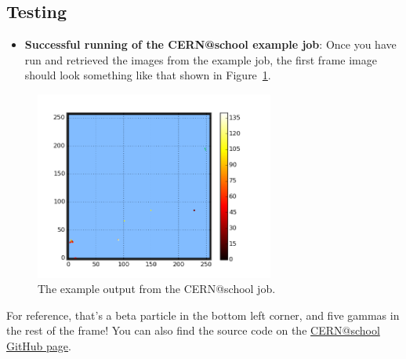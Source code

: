 \subsection{Testing}
\label{an-example-workflow-local-running---testing}

\begin{itemize}
\tightlist
\item
  \textbf{Successful running of the CERN@school example job}: Once you
  have run and retrieved the images from the example job, the first
  frame image should look something like that shown in
  Figure~\ref{fig:localrunningframe}.
\end{itemize}

%
\begin{figure}[htbp]
  \centering
  \includegraphics[width=0.7\textwidth]{assets/images/frame.png}
  \caption[The example output from the CERN@school job.]
  {\label{fig:localrunningframe}The example output from the CERN@school job.}
\end{figure}
%

For reference, that's a beta particle in the bottom left corner, and
five gammas in the rest of the frame! You can also find the source code
on the
\href{http://github.com/CERNatschool/particle-rate-plotter}{CERN@school
GitHub page}.
